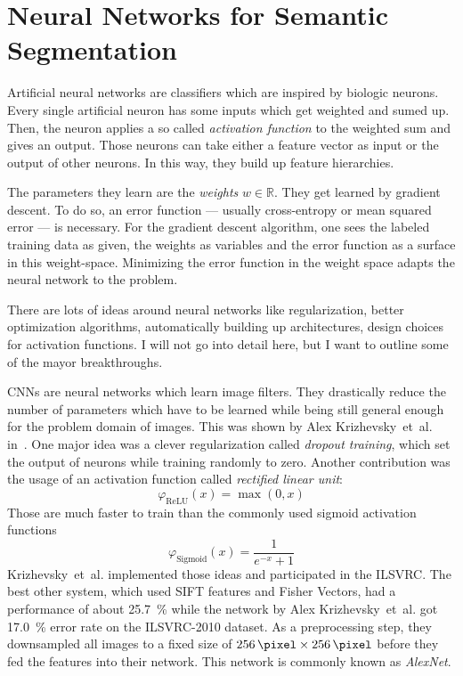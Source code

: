 
\section{Neural Networks for Semantic Segmentation}\label{sec:nn}

Artificial neural networks are classifiers which are inspired by biologic
neurons. Every single artificial neuron has some inputs which get weighted and
sumed up. Then, the neuron applies a so called \textit{activation function} to
the weighted sum and gives an output. Those neurons can take either a feature
vector as input or the output of other neurons. In this way, they build up
feature hierarchies.

The parameters they learn are the \textit{weights} $w \in \mathbb{R}$. They get
learned by gradient descent. To do so, an error function --- usually
cross-entropy or mean squared error --- is necessary. For the gradient descent
algorithm, one sees the labeled training data as given, the weights as
variables and the error function as a surface in this weight-space. Minimizing
the error function in the weight space adapts the neural network to the
problem.

There are lots of ideas around neural networks like regularization, better
optimization algorithms, automatically building up architectures, design
choices for activation functions. I will not go into detail here, but I want to
outline some of the mayor breakthroughs.

\Glspl{CNN} are neural networks which learn image filters. They drastically
reduce the number of parameters which have to be learned while being still
general enough for the problem domain of images. This was shown by Alex
Krizhevsky~et~al. in~\cite{krizhevsky2012imagenet}. One major idea was a clever
regularization called \textit{dropout training}, which set the output of
neurons while training randomly to zero. Another contribution was the usage of
an activation function called \textit{rectified linear unit}:
\[\varphi_{\text{ReLU}}(x) = \max(0, x)\]
Those are much faster to train than the commonly used sigmoid activation
functions
\[\varphi_{\text{Sigmoid}}(x) = \frac{1}{e^{-x} + 1}\]
Krizhevsky~et~al. implemented those ideas and participated in the
\gls{ILSVRC}. The best other system, which used SIFT features and Fisher
Vectors, had a performance of about \SI{25.7}{\percent} while the network by
Alex Krizhevsky~et~al. got \SI{17.0}{\percent} error rate on the ILSVRC-2010
dataset. As a preprocessing step, they downsampled all images to a fixed size
of $\SI{256}{\pixel} \times \SI{256}{\pixel}$ before they fed the features into
their network. This network is commonly known as \textit{AlexNet}.

